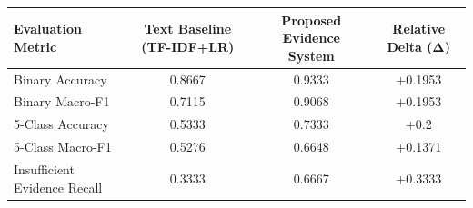 \begin{tabular}{lccc}
\hline
Evaluation Metric & Text Baseline (TF-IDF+LR) & Proposed Evidence System & Relative Delta (Δ) \\
\hline
Binary Accuracy & 0.8667 & 0.9333 & +0.1953 \\
Binary Macro-F1 & 0.7115 & 0.9068 & +0.1953 \\
5-Class Accuracy & 0.5333 & 0.7333 & +0.2 \\
5-Class Macro-F1 & 0.5276 & 0.6648 & +0.1371 \\
Insufficient Evidence Recall & 0.3333 & 0.6667 & +0.3333 \\
\hline
\end{tabular}
